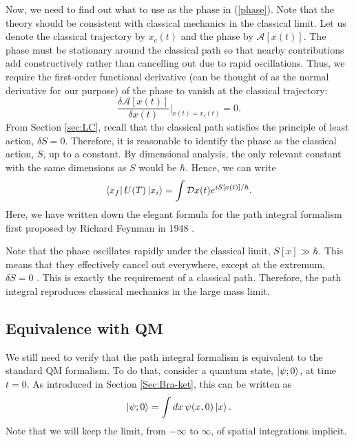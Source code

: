 \documentclass[12pt,a4paper]{article}
\begin{document}
Now, we need to find out what to use as the phase in (\ref{phase}). Note that the theory should be consistent with classical mechanics in the classical limit. Let us denote the classical trajectory by $x_c(t)$ and the phase by $\mathcal{A}[x(t)]$. The phase must be stationary around the classical path so that nearby contributions add constructively rather than cancelling out due to rapid oscillations. Thus, we require the first-order functional derivative (can be thought of as the normal derivative for our purpose) of the phase to vanish at the classical trajectory:
\begin{equation}
    \frac{\delta\mathcal{A}[x(t)]}{\delta x(t)}\bigg|_{x(t)=x_c(t)} = 0.
\end{equation}
From Section \ref{sec:LC}, recall that the classical path satisfies the principle of least action, $\delta S = 0$. Therefore, it is reasonable to identify the phase as the classical action, $S$, up to a constant. By dimensional analysis, the only relevant constant with the same dimensions as $S$ would be $\hbar$. Hence, we can write
\begin{equation}
    \bra{x_f}U(T)\ket{x_i} = \int \mathcal{D}x(t) e^{iS[x(t)]/\hbar}.
    \label{PI}
\end{equation}
Here, we have written down the elegant formula for the path integral formalism first proposed by Richard Feynman in 1948 \cite{Feynman1948, Peskin, TongQM}.

Note that the phase oscillates rapidly under the classical limit, $S[x]\gg\hbar$. This means that they effectively cancel out everywhere, except at the extremum, $\delta S = 0$ \cite{TongQM, Schwartz}. This is exactly the requirement of a classical path. Therefore, the path integral reproduces classical mechanics in the large mass limit.

\subsection{Equivalence with QM}
We still need to verify that the path integral formalism is equivalent to the standard QM formalism.
To do that, consider a quantum state, $\ket{\psi;0}$, at time $t=0$. As introduced in Section \ref{Sec:Bra-ket}, this can be written as
\begin{equation}
    \ket{\psi;0} = \int dx\, \psi(x,0) \ket{x}.
    \label{expan}
\end{equation}
Note that we will keep the limit, from $-\infty$ to $\infty$, of spatial integrations implicit.
\end{document}
